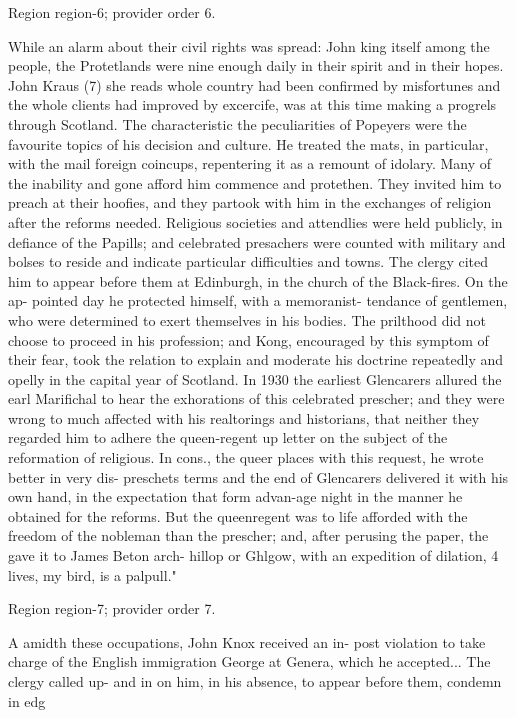 \documentclass[11pt]{article}
\begin{document}
{\scriptsize\color{gray} Region region-6; provider order 6.\par}
\medskip

While an alarm about their civil rights was spread: John king itself among the people, the Protetlands were nine enough daily in their spirit and in their hopes. John Kraus (7) she reads whole country had been confirmed by misfortunes and the whole clients had improved by excercife, was at this time making a progrels through Scotland. The characteristic the peculiarities of Popeyers were the favourite topics of his decision and culture. He treated the mats, in particular, with the mail foreign coincups, repentering it as a remount of idolary. Many of the inability and gone afford him commence and protethen. They invited him to preach at their hoofies, and they partook with him in the exchanges of religion after the reforms needed. Religious societies and attendlies were held publicly, in defiance of the Papills; and celebrated presachers were counted with military and bolses to reside and indicate particular difficulties and towns. The clergy cited him to appear before them at Edinburgh, in the church of the Black-fires. On the ap- pointed day he protected himself, with a memoranist- tendance of gentlemen, who were determined to exert themselves in his bodies. The prilthood did not choose to proceed in his profession; and Kong, encouraged by this symptom of their fear, took the relation to explain and moderate his doctrine repeatedly and opelly in the capital year of Scotland. In 1930 the earliest Glencarers allured the earl Marifichal to hear the exhorations of this celebrated prescher; and they were wrong to much affected with his realtorings and historians, that neither they regarded him to adhere the queen-regent up letter on the subject of the reformation of religious. In cons., the queer places with this request, he wrote better in very dis- preschets terms and the end of Glencarers delivered it with his own hand, in the expectation that form advan-age night in the manner he obtained for the reforms. But the queenregent was to life afforded with the freedom of the nobleman than the prescher; and, after perusing the paper, the gave it to James Beton arch- hillop or Ghlgow, with an expedition of dilation, 4 lives, my bird, is a palpull."
\par

{\scriptsize\color{gray} Region region-7; provider order 7.\par}
\medskip

A amidth these occupations, John Knox received an in- post violation to take charge of the English immigration George at Genera, which he accepted... The clergy called up- and in on him, in his absence, to appear before them, condemn in edg
\par
\end{document}
